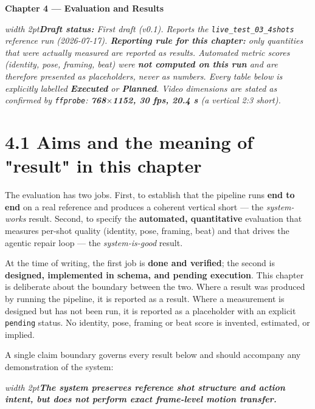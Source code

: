 \documentclass[10pt,twocolumn,letterpaper]{article}
\newenvironment{quotebox}%
 {\par\vspace{3pt}\noindent\begin{list}{}{\setlength{\leftmargin}{1em}\setlength{\rightmargin}{0.5em}}\item\footnotesize\itshape\color{black!80}\hspace*{-0.6em}\vrule width 2pt\hspace{0.6em}\ignorespaces}%
 {\end{list}\vspace{3pt}}
\begin{document}
\clearpage
{\centering\large\bfseries Chapter 4 --- Evaluation and Results\par}\vspace{4pt}

\begin{quotebox}\textbf{Draft status:} First draft (v0.1). Reports the \texttt{live\_test\_03\_4shots} reference run (2026-07-17). \textbf{Reporting rule for this chapter:} only quantities that were actually measured are reported as results. Automated metric scores (identity, pose, framing, beat) were \textbf{not computed on this run} and are therefore presented as \emph{placeholders}, never as numbers. Every table below is explicitly labelled \textbf{Executed} or \textbf{Planned}. Video dimensions are stated as confirmed by \texttt{ffprobe}: \textbf{768$\times$1152, 30 fps, 20.4 s} (a vertical 2:3 short).\end{quotebox}

\section*{4.1 Aims and the meaning of "result" in this chapter}

The evaluation has two jobs. First, to establish that the pipeline runs \textbf{end to end} on a real reference and produces a coherent vertical short --- the \emph{system-works} result. Second, to specify the \textbf{automated, quantitative} evaluation that measures per-shot quality (identity, pose, framing, beat) and that drives the agentic repair loop --- the \emph{system-is-good} result.

At the time of writing, the first job is \textbf{done and verified}; the second is \textbf{designed, implemented in schema, and pending execution}. This chapter is deliberate about the boundary between the two. Where a result was produced by running the pipeline, it is reported as a result. Where a measurement is designed but has not been run, it is reported as a placeholder with an explicit \texttt{pending} status. No identity, pose, framing or beat score is invented, estimated, or implied.

A single claim boundary governs every result below and should accompany any demonstration of the system:

\begin{quotebox}\textbf{The system preserves reference shot structure and action intent, but does not perform exact frame-level motion transfer.}\end{quotebox}
\end{document}
